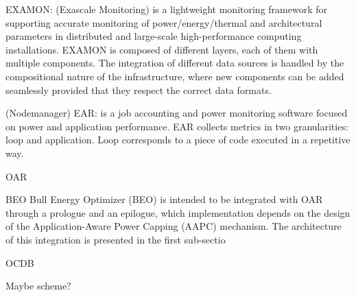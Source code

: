 EXAMON: (Exascale Monitoring) is a lightweight monitoring framework for supporting
accurate monitoring of power/energy/thermal and architectural parameters in distributed
and large-scale high-performance computing installations. EXAMON is composed of different
layers, each of them with multiple components. The integration of different data sources is
handled by the compositional nature of the infrastructure, where new components can be
added seamlessly provided that they respect the correct data formats.


(Nodemanager) EAR: is a job accounting and power monitoring software focused on power and application
performance. EAR collects metrics in two granularities: loop and application. Loop
corresponds to a piece of code executed in a repetitive way. 

OAR

BEO Bull Energy Optimizer (BEO) is intended to be integrated with OAR through a prologue and an
epilogue, which implementation depends on the design of the Application-Aware Power Capping (AAPC) mechanism. The architecture of this integration is presented in the first
sub-sectio

OCDB

Maybe scheme?



